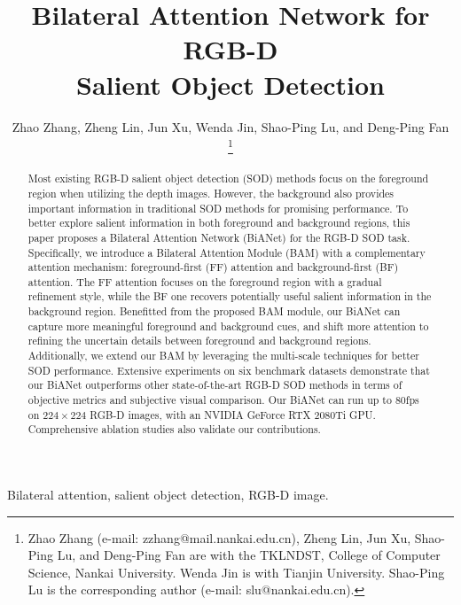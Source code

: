 \documentclass[journal]{IEEEtran}
\begin{document}
\title{Bilateral Attention Network for RGB-D \\ Salient Object Detection}


\author{Zhao Zhang,
        Zheng Lin,
        Jun Xu,
        Wenda Jin,
        Shao-Ping Lu,
        and Deng-Ping Fan


\thanks{Zhao Zhang (e-mail: zzhang@mail.nankai.edu.cn), Zheng Lin, Jun Xu, Shao-Ping Lu, and Deng-Ping Fan are with the TKLNDST, College of Computer Science, Nankai University. 
Wenda Jin is with Tianjin University.
Shao-Ping Lu is the corresponding author (e-mail: slu@nankai.edu.cn). 
}}


\maketitle

\begin{abstract}
Most existing RGB-D salient object detection (SOD) methods focus on the foreground region when utilizing the depth images.
However, the background also provides important information in traditional SOD methods for promising performance.
To better explore salient information in both foreground and background regions, this paper proposes a Bilateral Attention Network (BiANet) for the RGB-D SOD task.
Specifically, we introduce a Bilateral Attention Module (BAM) with a complementary attention mechanism: foreground-first (FF) attention and background-first (BF) attention.
The FF attention focuses on the foreground region with a gradual refinement style,
while the BF one recovers potentially useful salient information in the background region.
Benefitted from the proposed BAM module, our BiANet can capture more meaningful foreground and background cues,
and shift more attention to refining the uncertain details between foreground and background regions.
Additionally, we extend our BAM by leveraging the multi-scale techniques for better SOD performance.
Extensive experiments on six benchmark datasets demonstrate that our BiANet outperforms other state-of-the-art RGB-D SOD methods in terms of objective metrics and subjective visual comparison.
Our BiANet can run up to 80fps
on $224\times 224$ RGB-D images, with an NVIDIA GeForce RTX 2080Ti GPU.
Comprehensive ablation studies also validate our contributions.
\end{abstract}

\begin{IEEEkeywords}
Bilateral attention, salient object detection, RGB-D image.
\end{IEEEkeywords}
\end{document}

